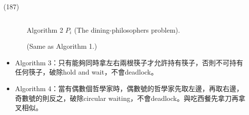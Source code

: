 \begin{theorem}{(187)}
\begin{itemize}
\begin{itemize}
\begin{lstlisting}[caption={Shared variables of The dining-philosophers problem.}, captionpos=b, mathescape=true]
            \end{lstlisting}
            \begin{algorithm}[H]
                \caption{Algorithm 2 $P_i$ (The dining-philosophers problem).}
                \begin{algorithmic}[1]
                        \Repeat
                            \State {}
                            \State (Same as Algorithm 1.) 
                            \State {}
                    \EndFunction
                \end{algorithmic}
            \end{algorithm}
        \end{itemize}
        \item Algorithm 3：只有能夠同時拿左右兩根筷子才允許持有筷子，否則不可持有任何筷子，破除hold and wait，不會deadlock。
        \item Algorithm 4：當有偶數個哲學家時，偶數號的哲學家先取左邊，再取右邊，奇數號的則反之，破除circular waiting，不會deadlock。與吃西餐先拿刀再拿叉相似。
    \end{itemize}
\end{theorem}

